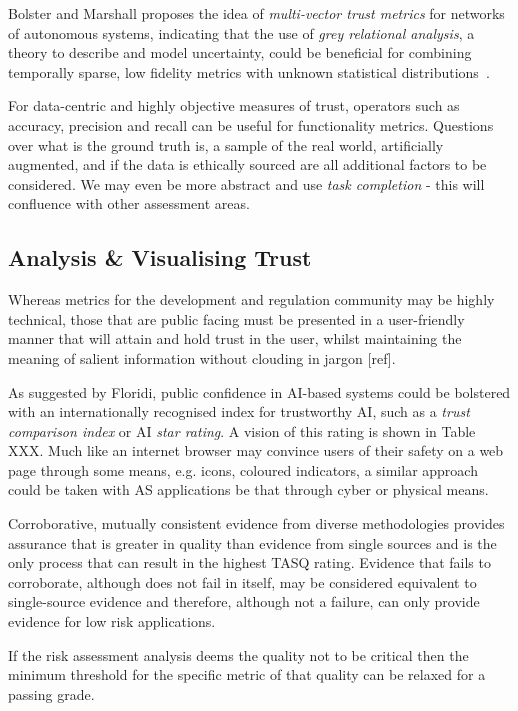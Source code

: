 Bolster and Marshall proposes the idea of \emph{multi-vector trust metrics} for networks of autonomous systems, indicating that the use of \emph{grey relational analysis}, a theory to describe and model uncertainty, could be beneficial for combining temporally sparse, low fidelity metrics with unknown statistical distributions~\cite{Bolster2014}. 

For data-centric and highly objective measures of trust, operators such as accuracy, precision and recall can be useful for functionality metrics. Questions over what is the ground truth is, a sample of the real world, artificially augmented, and if the data is ethically sourced are all additional factors to be considered. We may even be more abstract and use \emph{task completion} - this will confluence with other assessment areas.



\subsection{Analysis \& Visualising Trust}

Whereas metrics for the development and regulation community may be highly technical, those that are public facing must be presented in a user-friendly manner that will attain and hold trust in the user, whilst maintaining the meaning of salient information without clouding in jargon [ref]. 

As suggested by Floridi, public confidence in AI-based systems could be bolstered with an internationally recognised index for trustworthy AI, such as a \emph{trust comparison index} or AI \emph{star rating}. A vision of this rating is shown in Table XXX. Much like an internet browser may convince users of their safety on a web page through some means, e.g. icons, coloured indicators, a similar approach could be taken with AS applications be that through cyber or physical means.


Corroborative, mutually consistent evidence from diverse methodologies provides assurance that is greater in quality than evidence from single sources and is the only process that can result in the highest TASQ rating. Evidence that fails to corroborate, although does not fail in itself, may be considered equivalent to single-source evidence and therefore, although not a failure, can only provide evidence for low risk applications.


If the risk assessment analysis deems the quality not to be critical then the minimum threshold for the specific metric of that quality can be relaxed for a passing grade. 


